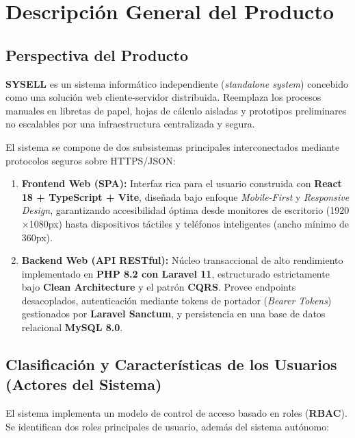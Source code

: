 
\section{Descripción General del Producto}

\subsection{Perspectiva del Producto}
\textbf{SYSELL} es un sistema informático independiente (\textit{standalone system}) concebido como una solución web cliente-servidor distribuida. Reemplaza los procesos manuales en libretas de papel, hojas de cálculo aisladas y prototipos preliminares no escalables por una infraestructura centralizada y segura.

El sistema se compone de dos subsistemas principales interconectados mediante protocolos seguros sobre HTTPS/JSON:
\begin{enumerate}[leftmargin=*]
    \item \textbf{Frontend Web (SPA):} Interfaz rica para el usuario construida con \textbf{React 18 + TypeScript + Vite}, diseñada bajo enfoque \textit{Mobile-First} y \textit{Responsive Design}, garantizando accesibilidad óptima desde monitores de escritorio (1920$\times$1080px) hasta dispositivos táctiles y teléfonos inteligentes (ancho mínimo de 360px).
    \item \textbf{Backend Web (API RESTful):} Núcleo transaccional de alto rendimiento implementado en \textbf{PHP 8.2 con Laravel 11}, estructurado estrictamente bajo \textbf{Clean Architecture} y el patrón \textbf{CQRS}. Provee endpoints desacoplados, autenticación mediante tokens de portador (\textit{Bearer Tokens}) gestionados por \textbf{Laravel Sanctum}, y persistencia en una base de datos relacional \textbf{MySQL 8.0}.
\end{enumerate}

\subsection{Clasificación y Características de los Usuarios (Actores del Sistema)}
El sistema implementa un modelo de control de acceso basado en roles (\textbf{RBAC}). Se identifican dos roles principales de usuario, además del sistema autónomo:

